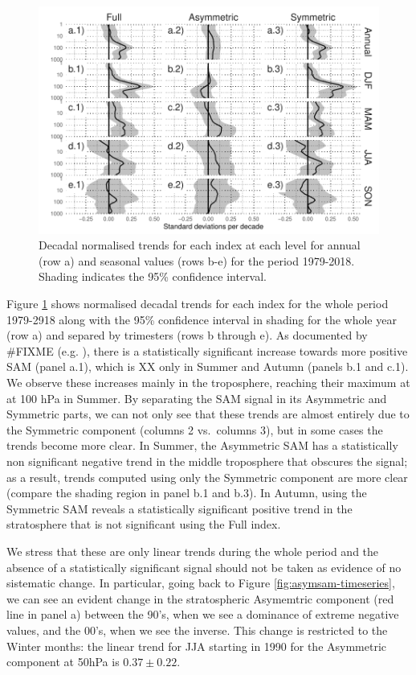 \documentclass[]{ametsocV5}
\begin{document}
\begin{figure}
\includegraphics{trends-1} \caption[Decadal normalised trends for each index at each level for annual (row a) and seasonal values (rows b-e) for the period 1979-2018]{Decadal normalised trends for each index at each level for annual (row a) and seasonal values (rows b-e) for the period 1979-2018. Shading indicates the 95\% confidence interval.}\label{fig:trends}
\end{figure}

Figure \ref{fig:trends} shows normalised decadal trends for each index
for the whole period 1979-2918 along with the 95\% confidence interval
in shading for the whole year (row a) and separed by trimesters (rows b
through e). As documented by \#FIXME (e.g. \citet{fogt2020}), there is a
statistically significant increase towards more positive SAM (panel
a.1), which is XX only in Summer and Autumn (panels b.1 and c.1). We
observe these increases mainly in the troposphere, reaching their
maximum at at 100 hPa in Summer. By separating the SAM signal in its
Asymmetric and Symmetric parts, we can not only see that these trends
are almost entirely due to the Symmetric component (columns 2
vs.~columns 3), but in some cases the trends become more clear. In
Summer, the Asymmetric SAM has a statistically non significant negative
trend in the middle troposphere that obscures the signal; as a result,
trends computed using only the Symmetric component are more clear
(compare the shading region in panel b.1 and b.3). In Autumn, using the
Symmetric SAM reveals a statistically significant positive trend in the
stratosphere that is not significant using the Full index.

We stress that these are only linear trends during the whole period and
the absence of a statistically significant signal should not be taken as
evidence of no sistematic change. In particular, going back to Figure
\ref{fig:asymsam-timeseries}, we can see an evident change in the
stratospheric Asymemtric component (red line in panel a) between the
90's, when we see a dominance of extreme negative values, and the 00's,
when we see the inverse. This change is restricted to the Winter months:
the linear trend for JJA starting in 1990 for the Asymmetric component
at 50hPa is \(0.37 \pm 0.22\).
\end{document}
